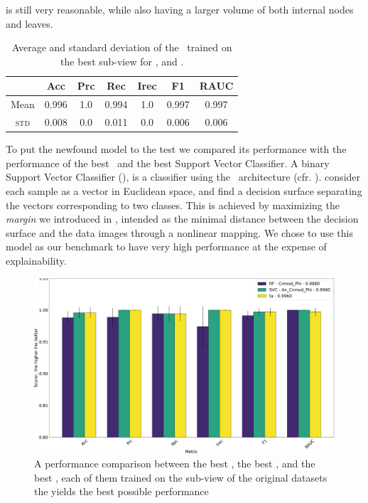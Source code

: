 is still very reasonable, while also having a larger volume of both internal nodes and leaves.
\begin{table}[!ht]
	\caption{Average and standard deviation of the \ta\ trained on the best sub-view for \an, \bn and
		\cnmod.}\label{tbl:an-bn-cnmod-ta-perf}

	\setlength{\tabcolsep}{6pt}
	\centering
	\begin{tabular}{ccccccc}
		\toprule
		\textbf{}    & \textbf{Acc} & \textbf{Prc} & \textbf{Rec} & \textbf{Irec} & \textbf{F1} & \textbf{RAUC} \\
		\midrule
		Mean         & 0.996        & 1.0          & 0.994        & 1.0           & 0.997
		             & 0.997                                                                                    \\
		\textsc{std} & 0.008        & 0.0          & 0.011        & 0.0           & 0.006
		             & 0.006                                                                                    \\
		\bottomrule
	\end{tabular}
\end{table}

To put the newfound model to the test we compared its performance with the performance of the best
\rf\ and the best Support Vector Classifier. A binary Support Vector Classifier (\svc), is a classifier using the \svm\ architecture (cfr.
). \svcs consider each sample as a vector in Euclidean space, and find a decision
surface separating the vectors corresponding to two classes. This is achieved by maximizing the
\emph{margin} we introduced in , intended as the minimal distance between the decision
surface and the data images through a nonlinear mapping. We chose to use this model as our benchmark to have very high
performance at the expense of explainability.
\begin{figure}[!ht]
	\centering
	\includegraphics[width=0.6\linewidth]{img/best_rf_ta_svc_compared.png}
	\caption{A performance comparison between the best \rf, the best \svc, and the best \ta,
		each of them trained on the sub-view of the original datasets the yields the best possible
		performance} \label{fig:ta-rf-svc-comparison}
\end{figure}

